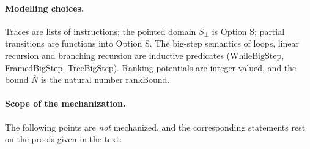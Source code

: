 \documentclass[oneside,english]{amsart}
\numberwithin{equation}{section}
\numberwithin{figure}{section}
\theoremstyle{plain}
\theoremstyle{definition}
\theoremstyle{plain}
\theoremstyle{remark}
\theoremstyle{plain}
\theoremstyle{definition}
\theoremstyle{plain}
\theoremstyle{remark}
\newcommand{\lean}[1]{{\ttfamily\small #1}}
\begin{document}
\paragraph{Modelling choices.}
Traces are lists of instructions; the pointed domain $S_\bot$ is \lean{Option S}; partial transitions are functions into \lean{Option S}. The big-step semantics of loops, linear recursion and branching recursion are inductive predicates (\lean{WhileBigStep}, \lean{FramedBigStep}, \lean{TreeBigStep}). Ranking potentials are integer-valued, and the bound $\bar{N}$ is the natural number \lean{rankBound}.

\paragraph{Scope of the mechanization.}
The following points are \emph{not} mechanized, and the corresponding statements rest on the proofs given in the text:
\end{document}
